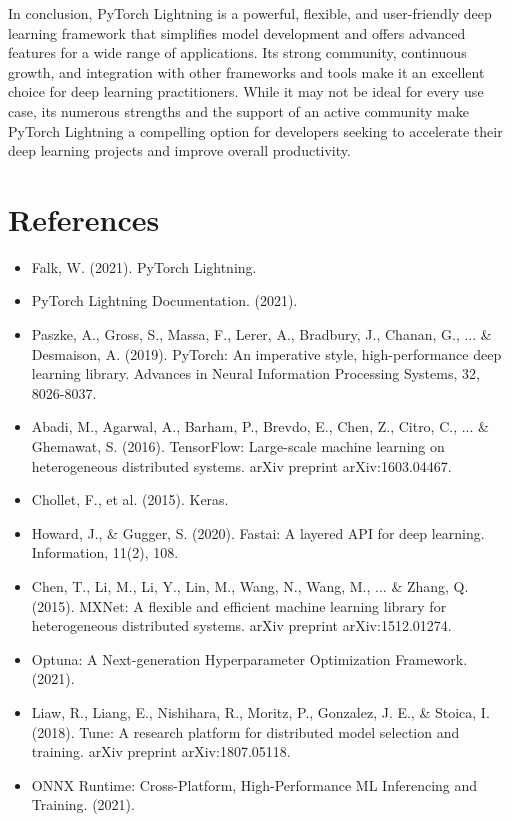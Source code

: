 \documentclass[12pt]{article}
\begin{document}
In conclusion, PyTorch Lightning is a powerful, flexible, and user-friendly deep learning framework that simplifies model development and offers advanced features for a wide range of applications. Its strong community, continuous growth, and integration with other frameworks and tools make it an excellent choice for deep learning practitioners. While it may not be ideal for every use case, its numerous strengths and the support of an active community make PyTorch Lightning a compelling option for developers seeking to accelerate their deep learning projects and improve overall productivity.

\section{References}

\begin{itemize}
    \item Falk, W. (2021). PyTorch Lightning.
    \item PyTorch Lightning Documentation. (2021).
    \item Paszke, A., Gross, S., Massa, F., Lerer, A., Bradbury, J., Chanan, G., ... \& Desmaison, A. (2019). PyTorch: An imperative style, high-performance deep learning library. Advances in Neural Information Processing Systems, 32, 8026-8037.
    \item Abadi, M., Agarwal, A., Barham, P., Brevdo, E., Chen, Z., Citro, C., ... \& Ghemawat, S. (2016). TensorFlow: Large-scale machine learning on heterogeneous distributed systems. arXiv preprint arXiv:1603.04467.
    \item Chollet, F., et al. (2015). Keras.
    \item Howard, J., \& Gugger, S. (2020). Fastai: A layered API for deep learning. Information, 11(2), 108.
    \item Chen, T., Li, M., Li, Y., Lin, M., Wang, N., Wang, M., ... \& Zhang, Q. (2015). MXNet: A flexible and efficient machine learning library for heterogeneous distributed systems. arXiv preprint arXiv:1512.01274.
    \item Optuna: A Next-generation Hyperparameter Optimization Framework. (2021).
    \item Liaw, R., Liang, E., Nishihara, R., Moritz, P., Gonzalez, J. E., \& Stoica, I. (2018). Tune: A research platform for distributed model selection and training. arXiv preprint arXiv:1807.05118.
    \item ONNX Runtime: Cross-Platform, High-Performance ML Inferencing and Training. (2021).
\end{itemize}


\end{document}
